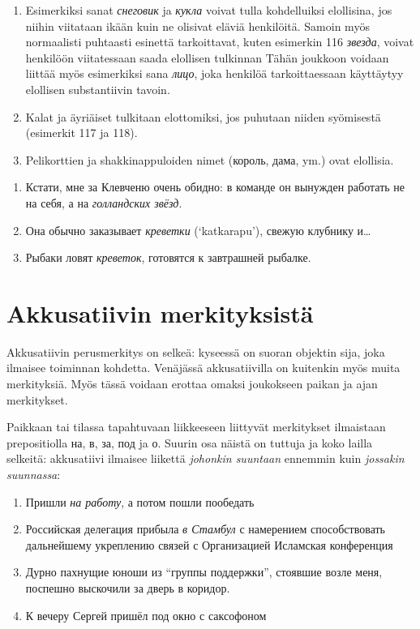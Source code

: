 \documentclass[]{scrreprt}
\providecommand{\tightlist}{%
  \setlength{\itemsep}{0pt}\setlength{\parskip}{0pt}}
\begin{document}
\begin{enumerate}
\def\labelenumi{\arabic{enumi}.}
\item
  Esimerkiksi sanat \emph{снеговик} ja \emph{кукла} voivat tulla
  kohdelluiksi elollisina, jos niihin viitataan ikään kuin ne olisivat
  eläviä henkilöitä. Samoin myös normaalisti puhtaasti esinettä
  tarkoittavat, kuten esimerkin 116 \emph{звезда}, voivat henkilöön
  viitatessaan saada elollisen tulkinnan Tähän joukkoon voidaan liittää
  myös esimerkiksi sana \emph{лицо}, joka henkilöä tarkoittaessaan
  käyttäytyy elollisen substantiivin tavoin.
\item
  Kalat ja äyriäiset tulkitaan elottomiksi, jos puhutaan niiden
  syömisestä (esimerkit 117 ja 118).
\item
  Pelikorttien ja shakkinappuloiden nimet (король, дама, ym.) ovat
  elollisia.
\end{enumerate}

\begin{enumerate}
\def\labelenumi{(\arabic{enumi})}
\setcounter{enumi}{115}
\tightlist
\item
  Кстати, мне за Клевченю очень обидно: в команде он вынужден работать
  не на себя, а на \emph{голландских звёзд}.
\item
  Она обычно заказывает \emph{креветки} (`katkarapu'), свежую клубнику
  и\ldots{}
\item
  Рыбаки ловят \emph{креветок}, готовятся к завтрашней рыбалке.
\end{enumerate}

\section{Akkusatiivin
merkityksistä}\label{akkusatiivin-merkityksistuxe4}

Akkusatiivin perusmerkitys on selkeä: kyseessä on suoran objektin sija,
joka ilmaisee toiminnan kohdetta. Venäjässä akkusatiivilla on kuitenkin
myös muita merkityksiä. Myös tässä voidaan erottaa omaksi joukokseen
paikan ja ajan merkitykset.

Paikkaan tai tilassa tapahtuvaan liikkeeseen liittyvät merkitykset
ilmaistaan prepositiolla на, в, за, под ja о. Suurin osa näistä on
tuttuja ja koko lailla selkeitä: akkusatiivi ilmaisee liikettä
\emph{johonkin suuntaan} ennemmin kuin \emph{jossakin suunnassa}:

\begin{enumerate}
\def\labelenumi{(\arabic{enumi})}
\setcounter{enumi}{118}
\tightlist
\item
  Пришли \emph{на работу}, а потом пошли пообедать
\item
  Российская делегация прибыла \emph{в Стамбул} с намерением
  способствовать дальнейшему укреплению связей с Организацией Исламская
  конференция
\item
  Дурно пахнущие юноши из ``группы поддержки'', стоявшие возле меня,
  поспешно выскочили за дверь в коридор.
\item
  К вечеру Сергей пришёл под окно с саксофоном
\end{enumerate}
\end{document}
